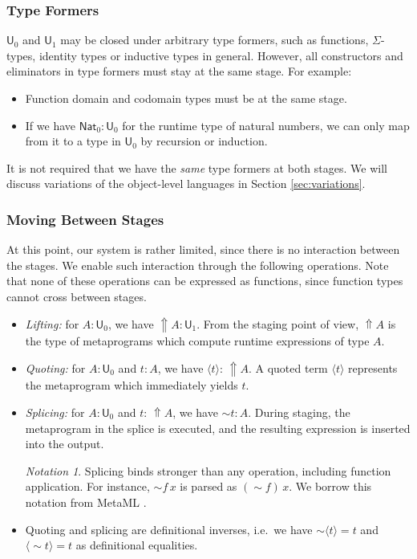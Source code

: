 \documentclass[acmsmall,screen]{acmart}
\newcommand{\msf}[1]{\mathsf{#1}}
\newcommand{\Lift}{{\Uparrow}}
\newcommand{\spl}{{\sim}}
\newcommand{\qut}[1]{\langle #1\rangle}
\newcommand{\U}{\msf{U}}
\newcommand{\Nat}{\msf{Nat}}
\theoremstyle{remark}
\newtheorem{notation}{Notation}
\begin{document}
\subsubsection{Type Formers} $\U_0$ and $\U_1$ may be closed under arbitrary type formers,
such as functions, $\Sigma$-types, identity types or inductive types in general.
However, all constructors and eliminators in type formers must stay at the same
stage. For example:
\begin{itemize}
  \item Function domain and codomain types must be at the same stage.
  \item If we have $\Nat_0 : \U_0$ for the runtime type of natural numbers,
        we can only map from it to a type in $\U_0$ by recursion or induction.
\end{itemize}
It is not required that we have the \emph{same} type formers at both stages. We
will discuss variations of the object-level languages in Section \ref{sec:variations}.

\subsubsection{Moving Between Stages}
At this point, our system is rather limited, since there is no interaction
between the stages. We enable such interaction through the following operations.
Note that none of these operations can be expressed as functions, since function
types cannot cross between stages.
\begin{itemize}
\item \emph{Lifting:} for $A : \U_0$, we have $\Lift A : \U_1$.  From the
  staging point of view, $\Lift A$ is the type of metaprograms which compute
  runtime expressions of type $A$.
\item \emph{Quoting:} for $A : \U_0$ and $t : A$, we have $\qut{t} :\,\Lift A$.
  A quoted term $\qut{t}$ represents the metaprogram which immediately yields
  $t$.
\item \emph{Splicing:} for $A : \U_0$ and $t :\,\Lift A$, we have $\spl t : A$.
  During staging, the metaprogram in the splice is executed, and the resulting
  expression is inserted into the output.

  \begin{notation} Splicing binds stronger than any operation, including function
    application. For instance, $\spl f\,x$ is parsed as $(\spl f)\,x$. We borrow
    this notation from MetaML \cite{metaml}.
  \end{notation}

\item Quoting and splicing are definitional inverses, i.e.\ we have $\spl\qut{t} = t$ and
  $\qut{\spl t}=t$ as definitional equalities.
\end{itemize}
\end{document}
